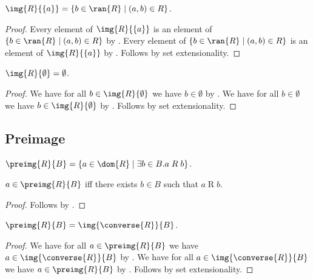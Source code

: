 \begin{proposition}\label{img_singleton}
    $\img{R}{\{a\}} = \{b\in\ran{R}\mid (a,b)\in R \}$.
\end{proposition}
\begin{proof}
    Every element of $\img{R}{\{a\}}$ is an element of
        $\{b\in\ran{R}\mid (a,b)\in R\}$
        by .
    Every element of $\{b\in\ran{R}\mid (a,b)\in R\}$ is an element of
        $\img{R}{\{a\}}$ by .
    Follows by set extensionality.
\end{proof}

\begin{proposition}\label{img_emptyset}
    $\img{R}{\emptyset} = \emptyset$.
\end{proposition}
\begin{proof}
    We have for all $b\in\img{R}{\emptyset}$ we have $b\in\emptyset$
        by .
    We have for all $b\in\emptyset$ we have $b\in\img{R}{\emptyset}$
        by .
    Follows by set extensionality.
\end{proof}

\subsection{Preimage}

\begin{definition}\label{preimg}
    $\preimg{R}{B} = \{a\in\dom{R} \mid \exists b\in B. a\mathrel{R} b \}$.
\end{definition}

\begin{proposition}\label{preimg_iff}
    $a\in\preimg{R}{B}$ iff there exists $b\in B$ such that $a\mathrel{R} b$.
\end{proposition}
\begin{proof}
    Follows by .
\end{proof}

\begin{proposition}\label{preim_eq_img_of_converse}
    $\preimg{R}{B} = \img{\converse{R}}{B}$.
\end{proposition}
\begin{proof}
    We have for all $a\in\preimg{R}{B}$
        we have $a\in\img{\converse{R}}{B}$
        by .
    We have for all $a\in\img{\converse{R}}{B}$
        we have $a\in\preimg{R}{B}$
        by .
    Follows by set extensionality.
\end{proof}

